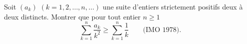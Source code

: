 Soit $(a_k)$ $(k = 1, 2, \ldots, n, \ldots)$ une suite d'entiers strictement positifs deux à deux distincts. Montrer que pour tout entier $n \geq 1$
\[ \sum_{k=1}^n \frac{a_k}{k^2} \geq \sum_{k=1}^n \frac{1}{k} \qquad \text{(IMO 1978).} \]
